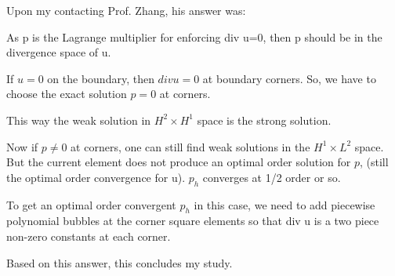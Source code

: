 Upon my contacting Prof. Zhang, his answer was:
\begin{displayquote}
{\color{darkgray}
 As p is the Lagrange multiplier for enforcing div u=0, then p should be in the divergence space of u.

If $u=0$ on the boundary, then $div u=0$ at boundary corners. 
So, we have to choose the exact solution $p=0$ at corners. 

This way the weak solution in $H^2 \times H^1$ space is the strong solution.

Now if $p \ne 0$ at corners,  one can still find weak solutions in the $H^1 \times L^2$ space.  
But the current element does not produce an optimal order solution for $p$,  
(still the optimal order convergence for u).   $p_h$ converges at 1/2 order or so.

To get an optimal order convergent $p_h$ in this case,  we need to add piecewise polynomial 
bubbles at the corner square elements so that div u is a two piece non-zero constants at each corner.
}
\end{displayquote}

Based on this answer, this concludes my study.  

